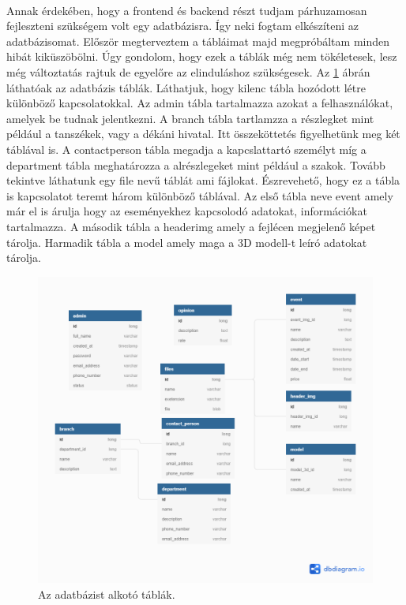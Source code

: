 	\paragraph{}
	Annak érdekében, hogy a frontend és backend részt tudjam párhuzamosan fejleszteni szükségem volt egy adatbázisra. Így neki fogtam elkészíteni az adatbázisomat. Először megterveztem a tábláimat majd megpróbáltam minden hibát kiküszöbölni. Úgy gondolom, hogy ezek a táblák még nem tökéletesek, lesz még változtatás rajtuk de egyelőre az elinduláshoz szükségesek. Az \ref{fig:database} ábrán láthatóak az adatbázis táblák. Láthatjuk, hogy kilenc tábla hozódott létre különböző kapcsolatokkal. Az admin tábla tartalmazza azokat a felhasználókat, amelyek be tudnak jelentkezni. A branch tábla tartlamzza a részlegket mint például a tanszékek, vagy a dékáni hivatal. Itt összeköttetés figyelhetünk meg két táblával is. A contactperson tábla megadja a kapcslattartó személyt míg a department tábla meghatározza a alrészlegeket mint például a szakok. Tovább tekintve láthatunk egy file nevű táblát ami fájlokat. Észrevehető, hogy ez a tábla is kapcsolatot teremt három különböző táblával. Az első tábla neve event amely már el is árulja hogy az eseményekhez kapcsolodó adatokat, információkat tartalmazza. A második tábla a headerimg amely a fejlécen megjelenő képet tárolja. Harmadik tábla a model amely maga a 3D modell-t leíró adatokat tárolja.
	\begin{figure}
		\centering
		\includegraphics[scale=0.5]{figures/images/Sapi3dTour.png}
		\caption{Az adatbázist alkotó táblák.}
		\label{fig:database}
	\end{figure}

